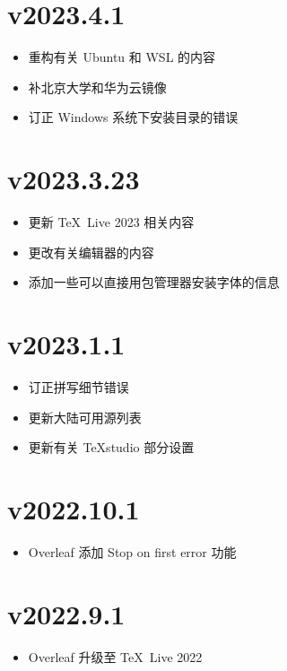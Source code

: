 \section*{v2023.4.1}

\begin{itemize}
  \item 重构有关 Ubuntu 和 WSL 的内容
  \item 补北京大学和华为云镜像
  \item 订正 Windows 系统下安装目录的错误
\end{itemize}

\section*{v2023.3.23}

\begin{itemize}
  \item 更新 \TeX~Live 2023 相关内容
  \item 更改有关编辑器的内容
  \item 添加一些可以直接用包管理器安装字体的信息
\end{itemize}

\section*{v2023.1.1}

\begin{itemize}
  \item 订正拼写细节错误
  \item 更新大陆可用源列表
  \item 更新有关 \TeX studio 部分设置
\end{itemize}

\section*{v2022.10.1}

\begin{itemize}
  \item Overleaf 添加 Stop on first error 功能
\end{itemize}

\section*{v2022.9.1}

\begin{itemize}
  \item Overleaf 升级至 \TeX~Live 2022
\end{itemize}

